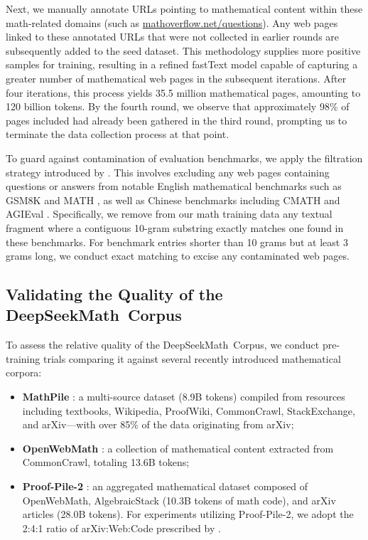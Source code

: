 Next, we manually annotate URLs pointing to mathematical content within these math-related domains (such as \url{mathoverflow.net/questions}). Any web pages linked to these annotated URLs that were not collected in earlier rounds are subsequently added to the seed dataset. This methodology supplies more positive samples for training, resulting in a refined fastText model capable of capturing a greater number of mathematical web pages in the subsequent iterations. After four iterations, this process yields 35.5 million mathematical pages, amounting to 120 billion tokens. By the fourth round, we observe that approximately 98\% of pages included had already been gathered in the third round, prompting us to terminate the data collection process at that point.

To guard against contamination of evaluation benchmarks, we apply the filtration strategy introduced by \cite{deepseek-coder}. This involves excluding any web pages containing questions or answers from notable English mathematical benchmarks such as GSM8K \citep{gsm8k} and MATH \citep{MATH}, as well as Chinese benchmarks including CMATH \citep{wei2023cmath} and AGIEval \citep{agieval}. Specifically, we remove from our math training data any textual fragment where a contiguous 10-gram substring exactly matches one found in these benchmarks. For benchmark entries shorter than 10 grams but at least 3 grams long, we conduct exact matching to excise any contaminated web pages.

\subsection{Validating the Quality of the DeepSeekMath~Corpus}

To assess the relative quality of the DeepSeekMath~Corpus, we conduct pre-training trials comparing it against several recently introduced mathematical corpora:

\begin{itemize}[topsep=0pt]
    \item \textbf{MathPile} \citep{mathpile}: a multi-source dataset (8.9B tokens) compiled from resources including textbooks, Wikipedia, ProofWiki, CommonCrawl, StackExchange, and arXiv—with over 85\% of the data originating from arXiv;
    \item \textbf{OpenWebMath} \citep{openwebmath}: a collection of mathematical content extracted from CommonCrawl, totaling 13.6B tokens;
    \item \textbf{Proof-Pile-2} \citep{llemma}: an aggregated mathematical dataset composed of OpenWebMath, AlgebraicStack (10.3B tokens of math code), and arXiv articles (28.0B tokens). For experiments utilizing Proof-Pile-2, we adopt the 2:4:1 ratio of arXiv:Web:Code prescribed by \cite{llemma}.
\end{itemize}

